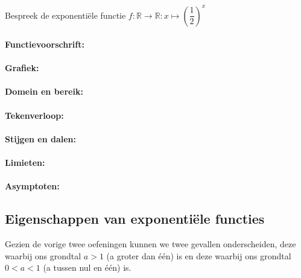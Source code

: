 \documentclass[12pt,twoside]{article}
\begin{document}
\begin{oefening}
Bespreek de exponentiële functie $f:\mathbb{R}\to\mathbb{R}: x\mapsto \left(\dfrac{1}{2}\right)^x$
\paragraph*{Functievoorschrift:}
\begin{center}
\visgraad{12cm}
\end{center}
\paragraph*{Grafiek:}
\begin{center}
\vspace*{-0.5cm}
\end{center}
\paragraph*{Domein en bereik:} \arulefill
\paragraph*{Tekenverloop:}
\begin{center}
\vspace*{-0.5cm}
\visgraad{5cm}
\end{center}
\paragraph*{Stijgen en dalen:}
\begin{center}
\vspace*{-0.5cm}
\visgraad{5cm}
\end{center}
\paragraph*{Limieten:} \arulefill
\paragraph*{Asymptoten:} \arulefill
\end{oefening}

\subsection{Eigenschappen van exponentiële functies}

Gezien de vorige twee oefeningen kunnen we twee gevallen onderscheiden, deze waarbij ons grondtal $a>1$ (a groter dan één) is en deze waarbij ons grondtal $0<a<1$ (a tussen nul en één) is.
\end{document}
